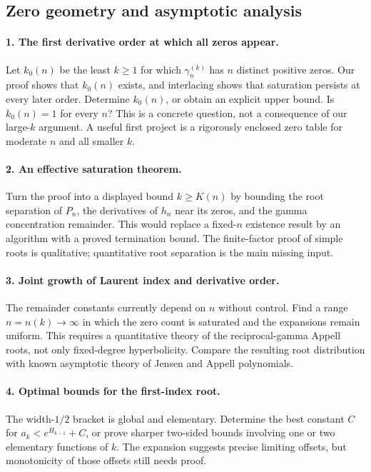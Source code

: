 \documentclass[11pt,a4paper]{article}
\theoremstyle{definition}
\theoremstyle{remark}
\numberwithin{equation}{section}
\begin{document}
\subsection{Zero geometry and asymptotic analysis}

\paragraph{1. The first derivative order at which all zeros appear.}
Let $k_0(n)$ be the least $k\geq1$ for which $\gamma_n^{(k)}$ has
$n$ distinct positive zeros.  Our proof shows that $k_0(n)$ exists,
and interlacing shows that saturation persists at every later order.
Determine $k_0(n)$, or obtain an explicit upper bound.
Is $k_0(n)=1$ for every $n$?  This is a concrete question, not a
consequence of our large-$k$ argument.  A useful first project is a
rigorously enclosed zero table for moderate $n$ and all smaller $k$.

\paragraph{2. An effective saturation theorem.}
Turn the proof into a displayed bound $k\geq K(n)$ by bounding the root
separation of $P_n$, the derivatives of $h_n$ near its zeros, and the
gamma concentration remainder.  This would replace a fixed-$n$
existence result by an algorithm with a proved termination bound.
The finite-factor proof of simple roots is qualitative; quantitative
root separation is the main missing input.

\paragraph{3. Joint growth of Laurent index and derivative order.}
The remainder constants currently depend on $n$ without control.
Find a range $n=n(k)\to\infty$ in which the zero count is saturated and
the expansions remain uniform.  This requires a quantitative theory
of the reciprocal-gamma Appell roots, not only fixed-degree
hyperbolicity.  Compare the resulting root distribution with known
asymptotic theory of Jensen and Appell polynomials.

\paragraph{4. Optimal bounds for the first-index root.}
The width-$1/2$ bracket is global and elementary.  Determine the best
constant $C$ for $a_k<e^{H_{k-1}}+C$, or prove sharper two-sided
bounds involving one or two elementary functions of $k$.
The expansion suggests precise limiting offsets, but monotonicity of
those offsets still needs proof.
\end{document}
